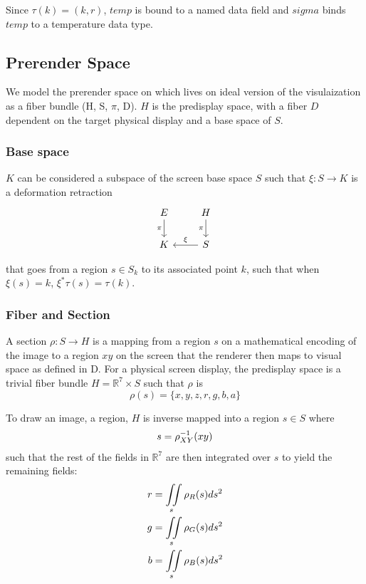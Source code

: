 \documentclass[../main.tex]{subfiles}
\begin{document}
Since $\tau(k)=(k, r)$, $temp$ is bound to a named data field and $sigma$ binds $temp$ to a temperature data type. 

\subsection{Prerender Space}
\label{sec:display}
We model the prerender space on which lives on ideal version of the visulaization as a fiber bundle (H, S, $\pi$, D). $H$ is the predisplay space, with a fiber $D$ dependent on the target physical display and a base space of $S$. 

\subsubsection{Base space}
$K$ can be considered a subspace of the screen base space $S$ such that $\xi: S \rightarrow K$ is a deformation retraction \cite{RetractionTopology2020}
\begin{equation}
    \begin{tikzcd}
        E \arrow[d, "\pi"'] & H \arrow[d, "\pi"'] \\
        K                   & S \arrow[l, "\xi"']
        \end{tikzcd}
\end{equation}

that goes from a region $s \in S_{k}$ to its associated point $k$, such that when $\xi(s) = k$, $\xi^*\tau(s) = \tau(k)$. 

\subsubsection{Fiber and Section}
A section $\rho: S \rightarrow H$ is a mapping from a region $s$ on a mathematical encoding of the image to a region $xy$ on the screen that the renderer then maps to visual space as defined in D. For a physical screen display, the predisplay space is a trivial fiber bundle $H=\mathbb{R}^{7}\times S$ such that $\rho$ is
\begin{equation}
    \rho(s)  = \{x, y, z, r, g, b, a\}
    \label{eq:rho}
\end{equation}

To draw an image, a region, $H$ is inverse mapped into a region $s \in S$ where
\begin{equation}
s = \rho^{-1}_{\tiny{XY}}(xy)
\end{equation}
such that the rest of the fields in $\mathbb{R}^{7}$ are then integrated over $s$ to yield the remaining fields:
\begin{align}
    r &= \iint\limits_s \rho_{\tiny{R}}(s)ds^{2}\\
    g &= \iint\limits_s \rho_{\tiny{G}}(s)ds^{2}\\
    b &= \iint\limits_s \rho_{\tiny{B}}(s)ds^{2}
\end{align}
\end{document}
